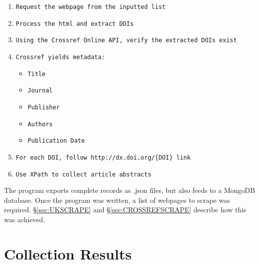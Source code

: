 \begin{sloppypar}
\begin{enumerate}
\item \texttt{Request the webpage from the inputted list}
\item \texttt{Process the html and extract DOIs}
\item \texttt{Using the Crossref Online API, verify the extracted DOIs exist}
\item \texttt{Crossref yields metadata:}
\begin{itemize}
\item \texttt{Title}
\item \texttt{Journal}
\item \texttt{Publisher}
\item \texttt{Authors}
\item \texttt{Publication Date}
\end{itemize}
\item \texttt{For each DOI,  follow \texttt{http://dx.doi.org/\{DOI\}} link}
\item \texttt{Use XPath to collect article abstracts}
\end{enumerate}
\end{sloppypar}
The program exports complete records as .json files, but also feeds to a MongoDB database. Once the program was written, a list of webpages to scrape was required. \S\ref{sec:UKSCRAPE} and \S\ref{sec:CROSSREFSCRAPE} describe how this was achieved.
\section{Collection Results}
